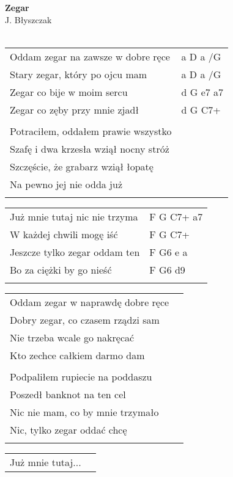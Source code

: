 \documentclass[a5paper]{article}
\begin{document}


\noindent
\fontsize{12pt}{15pt}\selectfont
\textbf{Zegar} \\
\fontsize{8pt}{10pt}\selectfont
J. Błyszczak \\ \\
\fontsize{10pt}{12pt}\selectfont
{}
\begin{tabular}{@{}p{7.00cm}p{3cm}@{}}
\noindent
Oddam zegar na zawsze w dobre ręce & a D a /G \\
Stary zegar, który po ojcu mam & a D a /G \\
Zegar co bije w moim sercu & d G e7 a7 \\
Zegar co zęby przy mnie zjadł & d G  C7+ \\ \\

Potraciłem, oddałem prawie wszystko \\
Szafę i dwa krzesła wziął nocny stróż \\
Szczęście, że grabarz wziął łopatę \\
Na pewno jej nie odda już \\ \\
\end{tabular}

\noindent
\begin{tabular}{@{}p{6.00cm}p{3cm}@{}} 
Już mnie tutaj nic nie trzyma & F G  C7+ a7 \\
W każdej chwili mogę iść & F G  C7+ \\
Jeszcze tylko zegar oddam ten & F G6 e a \\
Bo za ciężki by go nieść & F G6 d9 \\ \\
\end{tabular}

\noindent
\begin{tabular}{@{}p{7.00cm}p{3cm}@{}}
Oddam zegar w naprawdę dobre ręce \\
Dobry zegar, co czasem rządzi sam \\
Nie trzeba wcale go nakręcać \\
Kto zechce całkiem darmo dam \\ \\
 
Podpaliłem rupiecie na poddaszu\\
Poszedł banknot na ten cel\\
Nic nie mam, co by mnie trzymało\\
Nic, tylko zegar oddać chcę\\ \\
\end{tabular}

\noindent
\begin{tabular}{@{}p{7.00cm}p{3cm}@{}}
Już mnie tutaj...
\end{tabular}
\end{document}
